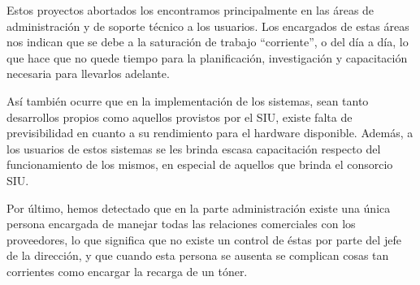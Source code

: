 \documentclass[a4paper,11pt,oneside]{article}
\begin{document}
Estos proyectos abortados los encontramos principalmente en las áreas
de administración y de soporte técnico a los usuarios. Los encargados
de estas áreas nos indican que se debe a la saturación de trabajo
``corriente'', o del día a día, lo que hace que no quede tiempo para
la planificación, investigación y capacitación necesaria para
llevarlos adelante.



Así también ocurre que en la implementación de los sistemas, sean
tanto desarrollos propios como aquellos provistos por el SIU, existe
falta de previsibilidad en cuanto a su rendimiento para el hardware
disponible. Además, a los usuarios de estos sistemas se les brinda
escasa capacitación respecto del funcionamiento de los mismos, en
especial de aquellos que brinda el consorcio SIU.


Por último, hemos detectado que en la parte administración existe una
única persona encargada de manejar todas las relaciones comerciales
con los proveedores, lo que significa que no existe un control de
éstas por parte del jefe de la dirección, y que cuando esta persona se
ausenta se complican cosas tan corrientes como encargar la recarga de
un tóner.
\end{document}
